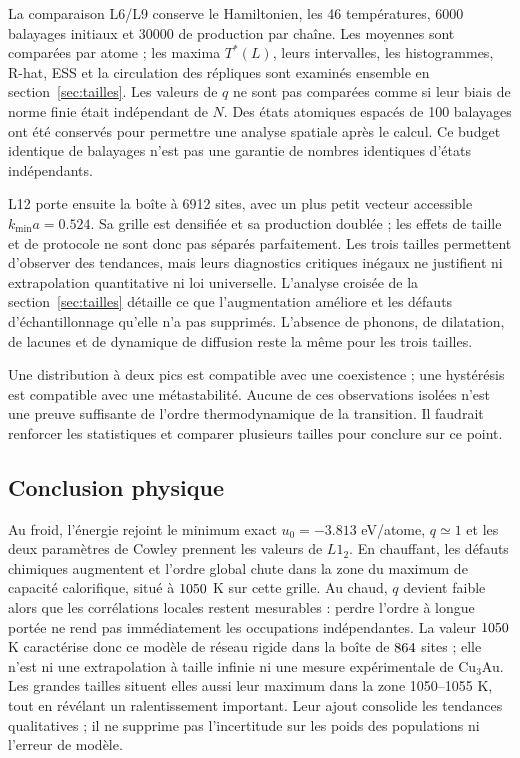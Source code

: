 \documentclass[10pt,a4paper]{article}
\begin{document}
La comparaison L6/L9 conserve le Hamiltonien, les 46 températures,
6000 balayages initiaux et 30000 de production par chaîne. Les moyennes
sont comparées par atome ; les maxima $T^*(L)$, leurs intervalles,
les histogrammes, R-hat, ESS et la circulation des répliques sont
examinés ensemble en section~\ref{sec:tailles}. Les valeurs de $q$ ne sont pas comparées comme
si leur biais de norme finie était indépendant de $N$. Des états
atomiques espacés de 100 balayages ont été conservés pour permettre
une analyse spatiale après le calcul. Ce budget identique de balayages
n'est pas une garantie de nombres identiques d'états indépendants.

L12 porte ensuite la boîte à 6912 sites, avec un plus petit vecteur
accessible $k_{\min}a=0.524$. Sa grille est densifiée et sa production
doublée ; les effets de taille et de protocole ne sont donc pas séparés
parfaitement. Les trois tailles permettent d'observer des tendances,
mais leurs diagnostics critiques inégaux ne justifient ni extrapolation
quantitative ni loi universelle. L'analyse croisée de la
section~\ref{sec:tailles} détaille ce que l'augmentation améliore et
les défauts d'échantillonnage qu'elle n'a pas supprimés.
L'absence de phonons, de dilatation, de lacunes et de dynamique de diffusion
reste la même pour les trois tailles.

Une distribution à deux pics est compatible avec une coexistence ; une
hystérésis est compatible avec une métastabilité. Aucune de ces observations
isolées n'est une preuve suffisante de l'ordre thermodynamique de la
transition. Il faudrait renforcer les statistiques et comparer plusieurs
tailles pour conclure sur ce point.

\begin{samepage}
\subsection{Conclusion physique}
Au froid, l'énergie rejoint le minimum exact
$u_0=-3.813$ eV/atome, $q\simeq1$ et les deux paramètres de Cowley
prennent les valeurs de $L1_2$. En chauffant, les défauts chimiques
augmentent et l'ordre global chute dans la zone du maximum de capacité
calorifique, situé à $1050$ K sur cette grille. Au chaud, $q$ devient
faible alors que les corrélations locales restent mesurables : perdre
l'ordre à longue portée ne rend pas immédiatement les occupations
indépendantes. La valeur $1050$ K caractérise donc ce modèle de réseau
rigide dans la boîte de $864$ sites ; elle n'est ni une extrapolation
à taille infinie ni une mesure expérimentale de Cu$_3$Au.
Les grandes tailles situent elles aussi leur maximum dans la zone
1050--1055 K, tout en révélant un ralentissement important. Leur ajout
consolide les tendances qualitatives ; il ne supprime pas l'incertitude
sur les poids des populations ni l'erreur de modèle.
\end{samepage}
\end{document}
